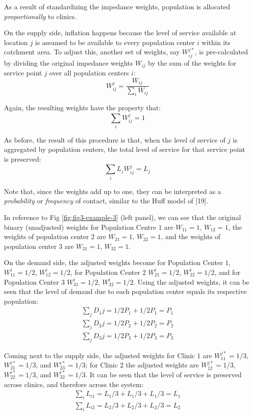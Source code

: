 \documentclass[10pt,letterpaper]{article}
\begin{document}
As a result of standardizing the impedance weights, population is
allocated \emph{proportionally} to clinics.

On the supply side, inflation happens because the level of service
available at location \(j\) is assumed to be available to every
population center \(i\) within its catchment area. To adjust this,
another set of weights, say \(W^{j*}_{ij}\), is pre-calculated by
dividing the original impedance weights \(W_{ij}\) by the sum of the
weights for service point \(j\) over all population centers \(i\): \[
W_{ij}^{j} = \frac{W_{ij}}{\sum_i W_{ij}}
\]

Again, the resulting weights have the property that: \[
\sum_iW_{ij}^{j}=1
\]

As before, the result of this procedure is that, when the level of
service of \(j\) is aggregated by population centers, the total level of
service for that service point is preserved: \[
\sum_i L_jW_{ij}^{j} = L_j 
\]

Note that, since the weights add up to one, they can be interpreted as a
\emph{probability} or \emph{frequency} of contact, similar to the Huff
model of {[}19{]}.

In reference to Fig \ref{fig:fig3-example-3} (left panel), we can see
that the original binary (unadjusted) weights for Population Centre
\(1\) are \(W_{11} = 1\), \(W_{12} = 1\), the weights of population
center \(2\) are \(W_{21} = 1\), \(W_{22} = 1\), and the weights of
population center \(3\) are \(W_{31} = 1\), \(W_{32} = 1\).

On the demand side, the adjusted weights become for Population Center
\(1\), \(W^{i}_{11} = 1/2\), \(W^{i}_{12} = 1/2\), for Population Center
\(2\) \(W^{i}_{21} = 1/2\), \(W^{i}_{22} = 1/2\), and for Population
Center \(3\) \(W^{i}_{31} = 1/2\), \(W^{i}_{32} = 1/2\). Using the
adjusted weights, it can be seen that the level of demand due to each
population center equals its respective population: \[
\begin{array}{ll}
            \sum_j D_1j = 1/2P_1 + 1/2P_1 = P_1\\
            \sum_j D_2j = 1/2P_2 + 1/2P_2 = P_2\\
            \sum_j D_3j = 1/2P_3 + 1/2P_3 = P_3
        \end{array}
\]

Coming next to the supply side, the adjusted weights for Clinic \(1\)
are \(W^{j*}_{11} = 1/3\), \(W^{i*}_{21} = 1/3\), and
\(W^{i*}_{23} = 1/3\); for Clinic \(2\) the adjusted weights are
\(W^{j*}_{12} = 1/3\), \(W^{i*}_{22} = 1/3\), and \(W^{i*}_{32} = 1/3\).
It can be seen that the level of service is preserved across clinics,
and therefore across the system: \[
\begin{array}{ll}
            \sum_i L_{i1} = L_{1}/3 + L_{1}/3 + L_{1}/3 = L_1\\
            \sum_i L_{i2} = L_{2}/3 + L_{2}/3 + L_{2}/3 = L_2
        \end{array}
\]
\end{document}
